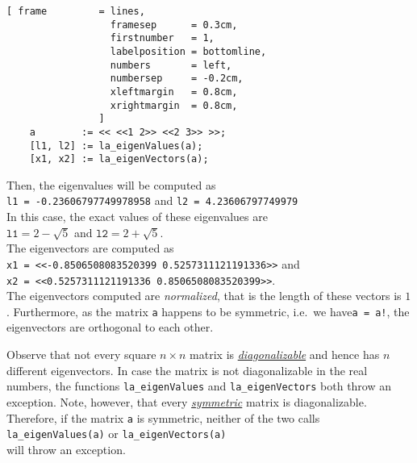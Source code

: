 \begin{Verbatim}[ frame         = lines, 
                  framesep      = 0.3cm, 
                  firstnumber   = 1,
                  labelposition = bottomline,
                  numbers       = left,
                  numbersep     = -0.2cm,
                  xleftmargin   = 0.8cm,
                  xrightmargin  = 0.8cm,
                ]
    a        := << <<1 2>> <<2 3>> >>;
    [l1, l2] := la_eigenValues(a);
    [x1, x2] := la_eigenVectors(a);
\end{Verbatim}

Then, the eigenvalues will be computed as
\\[0.2cm]
\hspace*{1.3cm}
\texttt{l1 = -0.23606797749978958} \quad and \quad \texttt{l2 = 4.23606797749979}
\\[0.2cm]
In this case, the exact values of these eigenvalues are 
\\[0.2cm]
\hspace*{1.3cm}
$\mathtt{l1} = 2 - \sqrt{5}$ \quad and \quad $\mathtt{l2} = 2 + \sqrt{5}$.
\\[0.2cm]
The eigenvectors are computed as 
\\[0.2cm]
\hspace*{1.3cm}
\texttt{x1 = <<-0.8506508083520399 0.5257311121191336>>} \quad and \\
\hspace*{1.3cm}
\texttt{x2 = <<0.5257311121191336 0.8506508083520399>>}.
\\[0.2cm]
The eigenvectors computed are \emph{normalized}, that is the length of these vectors is $1$.
Furthermore, as the matrix \texttt{a} happens to be symmetric, i.e.~we have\texttt{a = a!},
the eigenvectors are orthogonal to each other.

Observe that not every square $n \times n$ matrix is 
\href{http://en.wikipedia.org/wiki/Diagonalizable_matrix}{\emph{diagonalizable}}
and hence has $n$ different eigenvectors.  In case the matrix is not diagonalizable in the real
numbers, the functions \texttt{la\_eigenValues} and \texttt{la\_eigenVectors} both throw an
exception.  Note, however, that every 
\href{http://en.wikipedia.org/wiki/Symmetric_matrix}{\emph{symmetric}} matrix is diagonalizable.
Therefore, if the matrix \texttt{a} is symmetric, neither of the two calls
\\[0.2cm]
\hspace*{1.3cm}
\texttt{la\_eigenValues(a)} \quad or \quad \texttt{la\_eigenVectors(a)}
\\[0.2cm]
will throw an exception.





